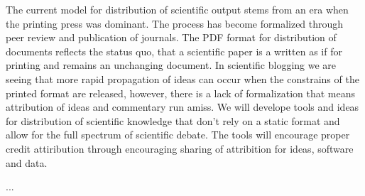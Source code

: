 \begin{workpackage}[id=social-aspects,wphases=12-24!.5,
  title=Social Aspects,
  UORM=1,USHRM=8]
\begin{tasklist}
\begin{task}[title=Modern Distribution of Scientific Output]
  The current model for distribution of scientific output stems from an era when the printing press was dominant. The process has become formalized through peer review and publication of journals. The PDF format for distribution of documents reflects the status quo, that a scientific paper is a written as if for printing and remains an unchanging document. In scientific blogging we are seeing that more rapid propagation of ideas can occur when the constrains of the printed format are released, however, there is a lack of formalization that means attribution of ideas and commentary run amiss. We will develope tools and ideas for distribution of scientific knowledge that don't rely on a static format and allow for the full spectrum of scientific debate. The tools will encourage proper credit attiribution through encouraging sharing of attribition for ideas, software and data.
\end{task}
\end{tasklist}


\begin{wpdelivs}
  \begin{wpdeliv}[due=12,id=social_...,dissem=??,nature=??]
      {...}
\end{wpdeliv}
\end{wpdelivs}
\end{workpackage}
